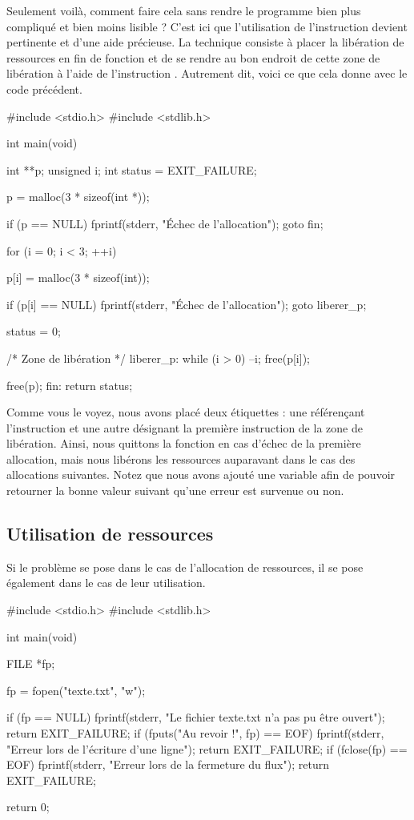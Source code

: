 Seulement voilà, comment faire cela sans rendre le programme bien plus
compliqué et bien moins lisible ? C'est ici que l'utilisation de
l'instruction  devient pertinente et d'une aide précieuse.
La technique consiste à placer la libération de ressources en fin de
fonction et de se rendre au bon endroit de cette zone de libération à
l'aide de l'instruction . Autrement dit, voici ce que cela
donne avec le code précédent.

\begin{C}
#include <stdio.h>
#include <stdlib.h>


int main(void)
{
    int **p;
    unsigned i;
    int status = EXIT_FAILURE;

    p = malloc(3 * sizeof(int *));

    if (p == NULL)
    {
        fprintf(stderr, "Échec de l'allocation\n");
        goto fin;
    }

    for (i = 0; i < 3; ++i)
    {
        p[i] = malloc(3 * sizeof(int));

        if (p[i] == NULL)
        {
            fprintf(stderr, "Échec de l'allocation\n");
            goto liberer_p;
        }
    }

    status = 0;

    /* Zone de libération */
liberer_p:
    while (i > 0)
    {
        --i;
        free(p[i]);
    }

    free(p);
fin:
    return status;
}
\end{C}

Comme vous le voyez, nous avons placé deux étiquettes : une référençant
l'instruction  et une autre désignant la première
instruction de la zone de libération. Ainsi, nous quittons la fonction
en cas d'échec de la première allocation, mais nous libérons les
ressources auparavant dans le cas des allocations suivantes. Notez que
nous avons ajouté une variable  afin de pouvoir retourner
la bonne valeur suivant qu'une erreur est survenue ou non.

\subsection{Utilisation de ressources}
\label{utilisation-de-ressources}

Si le problème se pose dans le cas de l'allocation de ressources, il se
pose également dans le cas de leur utilisation.

\begin{C}
#include <stdio.h>
#include <stdlib.h>


int main(void)
{
    FILE *fp;

    fp = fopen("texte.txt", "w");

    if (fp == NULL)
    {
        fprintf(stderr, "Le fichier texte.txt n'a pas pu être ouvert\n");
        return EXIT_FAILURE;
    }
    if (fputs("Au revoir !\n", fp) == EOF)
    {
        fprintf(stderr, "Erreur lors de l'écriture d'une ligne\n");
        return EXIT_FAILURE;
    }
    if (fclose(fp) == EOF)
    {
        fprintf(stderr, "Erreur lors de la fermeture du flux\n");
        return EXIT_FAILURE;        
    }

    return 0;
}
\end{C}

